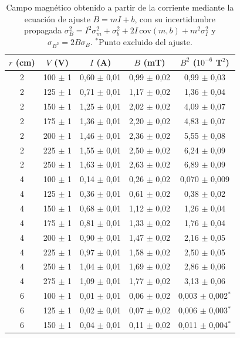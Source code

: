 \begin{table}[H]
\centering
\caption{Campo magnético obtenido a partir de la corriente mediante la ecuación de ajuste $B = mI + b$, con su incertidumbre propagada $\sigma_B^2 = I^2\sigma_m^2 + \sigma_b^2 + 2I\,\mathrm{cov}(m,b) + m^2\sigma_I^2$ y $\sigma_{B^2} = 2B\sigma_B$. $^{*}$Punto excluido del ajuste.}
\label{tab:campo}
\begin{tabular}{ccccc}
\toprule
$r$ (cm) & $V$ (V) & $I$ (A) & $B$ (mT) & $B^2$ ($10^{-6}$ T$^2$) \\
\midrule
2 & 100 $\pm$ 1 & 0,60 $\pm$ 0,01 & 0,99 $\pm$ 0,02 & 0,99 $\pm$ 0,03 \\
2 & 125 $\pm$ 1 & 0,71 $\pm$ 0,01 & 1,17 $\pm$ 0,02 & 1,36 $\pm$ 0,04 \\
2 & 150 $\pm$ 1 & 1,25 $\pm$ 0,01 & 2,02 $\pm$ 0,02 & 4,09 $\pm$ 0,07 \\
2 & 175 $\pm$ 1 & 1,36 $\pm$ 0,01 & 2,20 $\pm$ 0,02 & 4,83 $\pm$ 0,07 \\
2 & 200 $\pm$ 1 & 1,46 $\pm$ 0,01 & 2,36 $\pm$ 0,02 & 5,55 $\pm$ 0,08 \\
2 & 225 $\pm$ 1 & 1,55 $\pm$ 0,01 & 2,50 $\pm$ 0,02 & 6,24 $\pm$ 0,09 \\
2 & 250 $\pm$ 1 & 1,63 $\pm$ 0,01 & 2,63 $\pm$ 0,02 & 6,89 $\pm$ 0,09 \\
\midrule
4 & 100 $\pm$ 1 & 0,14 $\pm$ 0,01 & 0,26 $\pm$ 0,02 & 0,070 $\pm$ 0,009 \\
4 & 125 $\pm$ 1 & 0,36 $\pm$ 0,01 & 0,61 $\pm$ 0,02 & 0,38 $\pm$ 0,02 \\
4 & 150 $\pm$ 1 & 0,68 $\pm$ 0,01 & 1,12 $\pm$ 0,02 & 1,26 $\pm$ 0,04 \\
4 & 175 $\pm$ 1 & 0,81 $\pm$ 0,01 & 1,33 $\pm$ 0,02 & 1,76 $\pm$ 0,04 \\
4 & 200 $\pm$ 1 & 0,90 $\pm$ 0,01 & 1,47 $\pm$ 0,02 & 2,16 $\pm$ 0,05 \\
4 & 225 $\pm$ 1 & 0,97 $\pm$ 0,01 & 1,58 $\pm$ 0,02 & 2,50 $\pm$ 0,05 \\
4 & 250 $\pm$ 1 & 1,04 $\pm$ 0,01 & 1,69 $\pm$ 0,02 & 2,86 $\pm$ 0,06 \\
4 & 275 $\pm$ 1 & 1,09 $\pm$ 0,01 & 1,77 $\pm$ 0,02 & 3,13 $\pm$ 0,06 \\
\midrule
6 & 100 $\pm$ 1 & 0,01 $\pm$ 0,01 & 0,06 $\pm$ 0,02 & 0,003 $\pm$ 0,002$^{*}$ \\
6 & 125 $\pm$ 1 & 0,02 $\pm$ 0,01 & 0,07 $\pm$ 0,02 & 0,006 $\pm$ 0,003$^{*}$ \\
6 & 150 $\pm$ 1 & 0,04 $\pm$ 0,01 & 0,11 $\pm$ 0,02 & 0,011 $\pm$ 0,004$^{*}$ \\

\end{tabular}
\end{table}
